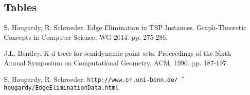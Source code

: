 \documentclass{article} \usepackage[left=2cm,top=1.5cm,right=2cm,
\DeclareRobustCommand\{{\ifmmode\lbrace\else\textbraceleft\fi}
\DeclareRobustCommand\}{\ifmmode\rbrace\else\textbraceright\fi}
\begin{document}
\subsection{Tables}

\begin{thebibliography}{99}
 S. Hougardy, R. Schroeder. Edge Elimination in TSP
  Instances. Graph-Theoretic Concepts in Computer Science, WG
  2014. pp. 275-286.

 J.L. Bentley. K-d trees for semidynamic point
  sets. Proceedings of the Sixth Annual Symposium on Computational
  Geometry, ACM, 1990. pp. 187-197.

 S. Hougardy,
  R. Schroeder.
  \texttt{http://www.or.uni-bonn.de/\~\,hougardy/EdgeEliminationData.html} 
\end{thebibliography}
\end{document}
